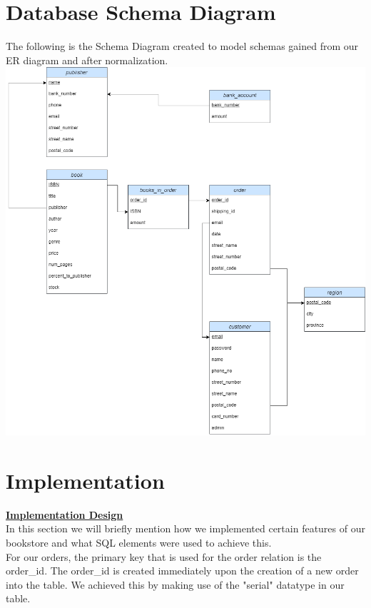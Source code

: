 \documentclass[a4 paper]{article}
\begin{document}
\section{Database Schema Diagram}

The following is the Schema Diagram created to model schemas gained from our ER diagram and after normalization.\\

\includegraphics[scale=0.5]{../Diagrams/Schema-diagram-comp3005-finalproject-after-normalization.drawio.png}\\

\section{Implementation}
\underline{\textbf{Implementation Design}}\\
In this section we will briefly mention how we implemented certain features of our bookstore and what SQL elements were used to achieve this.\\

\noindent For our orders, the primary key that is used for the order relation is the order\_id. The order\_id is created immediately upon the creation of a new order into the table. We achieved this by making use of the "serial" datatype in our table.\\
\end{document}
